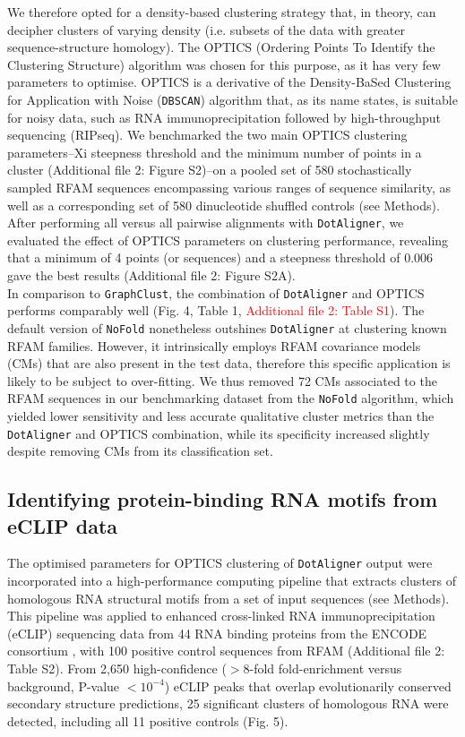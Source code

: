 \documentclass{bmcart}
\newcommand\dotaligner{\texttt{DotAligner}}
\begin{document}
We therefore opted for a density-based clustering strategy that, in theory, can decipher 
clusters of varying density (i.e. subsets of the data with greater sequence-structure homology). 
The OPTICS (Ordering Points To Identify the Clustering Structure) algorithm \cite{ankerst99ordering}
was chosen for this purpose, as it has very few parameters to optimise. 
OPTICS is a derivative of the Density-BaSed Clustering for Application with Noise
 (\texttt{DBSCAN}) \cite{ester1996density} algorithm that, as its name states, is suitable 
 for noisy data, such as RNA immunoprecipitation followed by high-throughput sequencing 
 (RIPseq). We  benchmarked the two main OPTICS clustering parameters--Xi steepness threshold 
and the minimum number of points in a cluster (Additional file 2: Figure S2)--on 
a pooled set of 580 stochastically sampled RFAM sequences encompassing various ranges of sequence similarity, 
as well as a corresponding set of 580 dinucleotide shuffled controls (see Methods). 
After performing all versus all pairwise alignments with \dotaligner{}, 
we evaluated the effect of OPTICS parameters on clustering performance, 
revealing that a minimum of 4 points (or sequences) and a steepness threshold of 0.006 
gave the best results (Additional file 2: Figure S2A). \\

In comparison to \texttt{GraphClust},  the combination of \dotaligner{} and OPTICS performs comparably well (Fig. 4, Table 1, \textcolor{red}{Additional file 2: Table S1}). 
The default version of \texttt{NoFold} nonetheless outshines \dotaligner{} at clustering known RFAM families. 
However, it intrinsically employs RFAM covariance models (CMs) that are also present in the test data, 
therefore this specific application is likely to be subject to over-fitting. 
We thus removed 72 CMs associated to the RFAM sequences in our benchmarking 
dataset from the \texttt{NoFold} algorithm, which yielded lower sensitivity and 
less accurate qualitative cluster metrics than the \dotaligner{} and OPTICS combination, while 
its specificity increased slightly despite removing CMs from its classification set. 


\subsection*{Identifying protein-binding RNA motifs from eCLIP data}
The optimised parameters for OPTICS clustering of \dotaligner{} output were incorporated into 
a high-performance computing pipeline that extracts clusters of homologous RNA structural
 motifs from a set of input sequences (see Methods).  This pipeline was applied to enhanced cross-linked 
RNA immunoprecipitation (eCLIP) sequencing data from 44 RNA binding proteins from the ENCODE consortium  \cite{van2016robust}, with 100 positive control sequences from RFAM (Additional file 2: Table S2).
From 2,650 high-confidence ($>$8-fold  fold-enrichment versus background, P-value $<10^{-4}$) eCLIP peaks 
that overlap evolutionarily conserved secondary structure predictions, 
25 significant clusters of homologous RNA were detected, including all 11 positive controls (Fig. 5).\\
\end{document}
